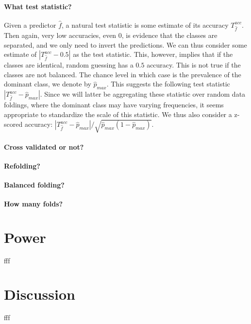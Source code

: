 \documentclass{pnastwo}
\newcommand{\hyp}{f} %
\newcommand{\hypEstim}{\hat{\hyp}} %
\newcommand{\acc}{T^{acc}}
\newcommand{\dominant}{\hat{p}_{max}}
\begin{document}
\begin{article}
\begin{description}
\paragraph{What test statistic?}
Given a predictor $\hypEstim$, a natural test statistic is some estimate of its accuracy $\acc_{\hypEstim}$.
Then again, very low accuracies, even $0$, is evidence that the classes are separated, and we only need to invert the predictions. We can thus consider some estimate of $|\acc_{\hypEstim}-0.5|$ as the test statistic.
This, however, implies that if the classes are identical, random guessing has a $0.5$ accuracy. This is not true if the classes are not balanced. 
The chance level in which case is the prevalence of the dominant class, we denote by $\dominant$.
This suggests the following test statistic $|\acc_{\hypEstim}-\dominant|$.
Since we will latter be aggregating these statistic over random data foldings, where the dominant class may have varying frequencies, it seems appropriate to standardize the scale of this statistic. 
We thus also consider a z-scored accuracy: $|\acc_{\hypEstim}-\dominant|/\sqrt{\dominant(1-\dominant)}$.


\paragraph{Cross validated or not?}

\paragraph{Refolding?}

\paragraph{Balanced folding?}

\paragraph{How many folds?}



\end{description}



\section{Power}
fff





\section{Discussion}
% 
fff


\end{article}
\end{document}
